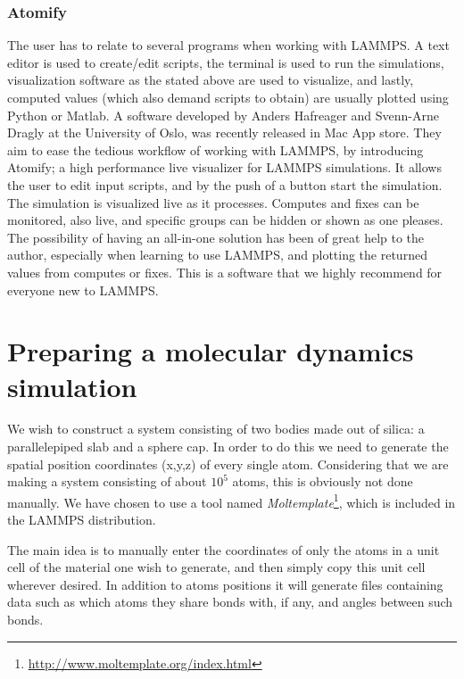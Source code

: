 \documentclass[twoside,english]{uiofysmaster}
\begin{document}
\subsection{Atomify}
The user has to relate to several programs when working with LAMMPS. 
A text editor is used to create/edit scripts, the terminal is used to run the simulations, visualization software as the stated above are used to visualize, and lastly, computed values (which also demand scripts to obtain) are usually plotted using Python or Matlab. 
A software developed by Anders Hafreager and Svenn-Arne Dragly at the University of Oslo,  
was recently released in Mac App store.  
They aim to ease the tedious workflow of working with LAMMPS, by introducing Atomify; a high performance live visualizer for LAMMPS simulations.
It allows the user to edit input scripts, and by the push of a button start the simulation.
The simulation is visualized live as it processes.
Computes and fixes can be monitored, also live, and specific groups can be hidden or shown as one pleases. 
The possibility of having an all-in-one solution has been of great help to the author, especially when learning to use LAMMPS, and plotting the returned values from computes or fixes. 
This is a software that we highly recommend for everyone new to LAMMPS.   





\chapter{Preparing a molecular dynamics simulation}

We wish to construct a system consisting of two bodies made out of silica: a parallelepiped slab and a sphere cap. In order to do this we need to generate the spatial position coordinates (x,y,z) of every single atom. Considering that we are making a system consisting of about $10^5$ atoms, this is obviously not done manually. We have chosen to use a tool named \textit{Moltemplate}\footnote{\href{http://www.moltemplate.org/index.html}{http://www.moltemplate.org/index.html}}, which is included in the LAMMPS distribution.

The main idea is to manually enter the coordinates of only the atoms in a unit cell of the material one wish to generate, and then simply copy this unit cell wherever desired. In addition to atoms positions it will generate files containing data such as which atoms they share bonds with, if any, and angles between such bonds. 
\end{document}
